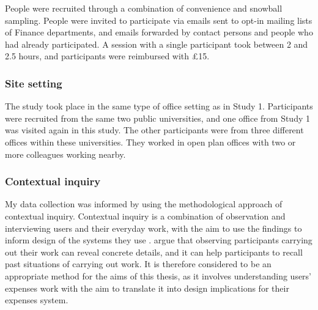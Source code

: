 People were recruited through a combination of convenience and snowball sampling. People were invited to participate via emails sent to opt-in mailing lists of Finance departments, and emails forwarded by contact persons and people who had already participated. A session with a single participant took between 2 and 2.5 hours, and participants were reimbursed with \pounds15.

\subsubsection{Site setting}
The study took place in the same type of office setting as in Study 1. Participants were recruited from the same two public universities, and one office from Study 1 was visited again in this study. The other participants were from three different offices within these universities. They worked in open plan offices with two or more colleagues working nearby. 

\subsubsection{Contextual inquiry}
My data collection was informed by using the methodological approach of contextual inquiry.
Contextual inquiry is a combination of observation and interviewing users and their everyday work, with the aim to use the findings to inform design of the systems they use \citep{Holtzblatt2014}.
\citet{Holtzblatt2014} argue that observing participants carrying out their work can reveal concrete details, and it can help participants to recall past situations of carrying out work. It is therefore considered to be an appropriate method for the aims of this thesis, as it involves understanding users' expenses work with the aim to translate it into design implications for their expenses system. 

